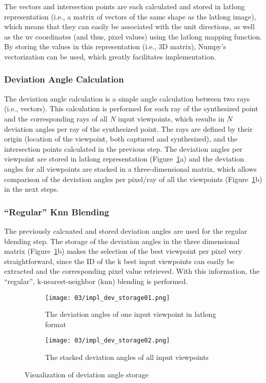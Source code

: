 The vectors and intersection points are each calculated and stored in latlong representation (i.e., a matrix of vectors of the same shape as the latlong image), which means that they can easily be associated with the unit directions, as well as the uv coordinates (and thus, pixel values) using the latlong mapping function. By storing the values in this representation (i.e., 3D matrix), Numpy's vectorization can be used, which greatly facilitates implementation.

\subsubsection{Deviation Angle Calculation}
The deviation angle calculation is a simple angle calculation between two rays (i.e., vectors). This calculation is performed for each ray of the synthesized point and the corresponding rays of all $N$ input viewpoints, which results in $N$ deviation angles per ray of the synthesized point. The rays are defined by their origin (location of the viewpoint, both captured and synthesized), and the intersection points calculated in the previous step. The deviation angles per viewpoint are stored in latlong representation (Figure~\ref{fig:dev_angle_storage}a) and the deviation angles for all viewpoints are stacked in a three-dimensional matrix, which allows comparison of the deviation angles per pixel/ray of all the viewpoints (Figure~\ref{fig:dev_angle_storage}b) in the next steps.

\subsubsection{``Regular'' Knn Blending}
The previously calcuated and stored deviation angles are used for the regular blending step. The storage of the deviation angles in the three dimensional matrix (Figure~\ref{fig:dev_angle_storage}b) makes the selection of the best viewpoint per pixel very straightforward, since the ID of the k best input viewpoints can easily be extracted and the corresponding pixel value retrieved. With this information, the ``regular'', k-nearest-neighbor (knn) blending is performed.

\begin{figure}
\centering
    \hfill
    \begin{subfigure}[t]{0.4\textwidth}
            \centering
            \texttt{[image: 03/impl\_dev\_storage01.png]}
            \caption{The deviation angles of one input viewpoint in latlong format}
    \end{subfigure}%
    \hfill
    \begin{subfigure}[t]{0.4\textwidth}
            \centering
            \texttt{[image: 03/impl\_dev\_storage02.png]}
            \caption{The stacked deviation angles of all input viewpoints}
    \end{subfigure}
    \hfill
  \caption{Visualization of deviation angle storage} \label{fig:dev_angle_storage}
\end{figure}

